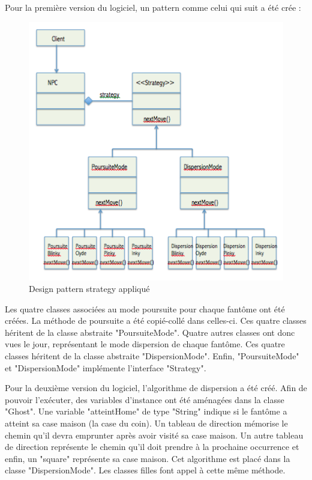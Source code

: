 \documentclass[a4paper,12pt]{report} %
\begin{document}
Pour la première version du logiciel, un pattern comme celui qui suit a été crée :

\begin{figure}[!h] %
		\centering
		\includegraphics[scale=0.9]{ressources/StrategyDP.png}
		\caption{Design pattern strategy appliqué}\label{figure3}
\end{figure}
\newpage

Les quatre classes associées au mode poursuite pour chaque fantôme ont été créées. La méthode de poursuite a été copié-collé dans celles-ci. Ces quatre classes héritent de la classe abstraite "PoursuiteMode".
Quatre autres classes ont donc vues le jour, représentant le mode dispersion de chaque fantôme.
Ces quatre classes héritent de la classe abstraite "DispersionMode".
Enfin, "PoursuiteMode" et "DispersionMode" implémente l'interface "Strategy".

Pour la deuxième version du logiciel, l'algorithme de dispersion a été créé.
Afin de pouvoir l'exécuter, des variables d'instance ont été aménagées dans la classe "Ghost". Une variable "atteintHome" de type "String" indique si le fantôme a atteint sa case maison (la case du coin). Un tableau de direction mémorise le chemin qu'il devra emprunter après avoir visité sa case maison. Un autre tableau de direction représente le chemin qu'il doit prendre à la prochaine occurrence et enfin, un "square" représente sa case maison.
Cet algorithme est placé dans la classe "DispersionMode". Les classes filles font appel à cette même méthode.
\end{document}
